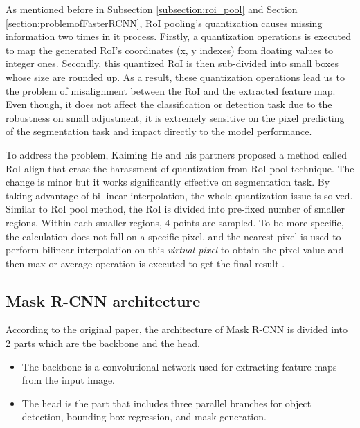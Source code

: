 	As mentioned before in Subsection \ref{subsection:roi_pool} and Section \ref{section:problemofFasterRCNN}, RoI pooling's quantization causes missing information two times in it process. Firstly, a quantization operations is executed to map the generated RoI's coordinates (x, y indexes) from floating values to integer ones. Secondly, this quantized RoI is then sub-divided into small boxes whose size are rounded up. As a result, these quantization operations lead us to the problem of misalignment between the RoI and the extracted feature map. Even though, it does not affect the classification or detection task due to the robustness on small adjustment, it is extremely sensitive on the pixel predicting of the segmentation task and impact directly to the model performance.
	
	To address the problem, Kaiming He and his partners proposed a method called RoI align that erase the harassment of quantization from RoI pool technique. The change is minor but it works significantly effective on segmentation task. By taking advantage of bi-linear interpolation, the whole quantization issue is solved. Similar to RoI pool method, the RoI is divided into pre-fixed number of smaller regions. Within each smaller regions, 4 points are sampled. To be more specific, the calculation does not fall on a specific pixel, and the nearest pixel is used to perform bilinear interpolation on this \textit{virtual pixel} to obtain the pixel value and then max or average operation is executed to get the final result \cite{maskrcnn}.

\subsection{Mask R-CNN architecture}
\label{subsection:architecture}
\noindent

	According to the original paper, the architecture of Mask R-CNN is divided into 2 parts which are the backbone and the head.	
	\begin{itemize}
		\item The backbone is a convolutional network used for extracting feature maps from the input image. 
		\item The head is the part that includes three parallel branches for object detection, bounding box regression, and mask generation.
	\end{itemize}
	
